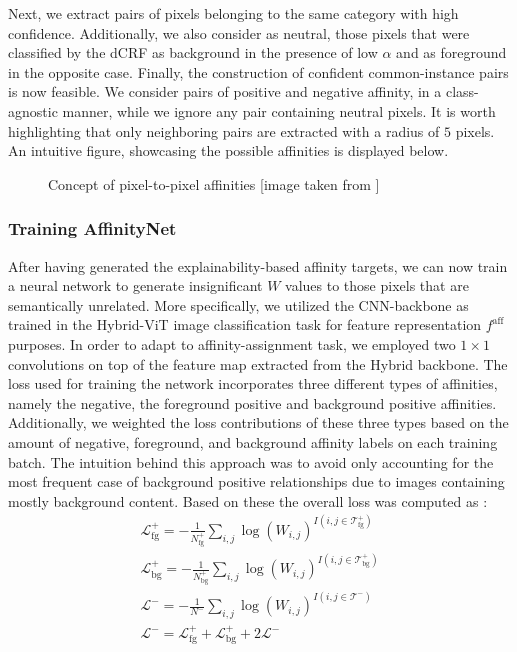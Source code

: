 Next, we extract pairs of pixels belonging to the same category with high confidence. Additionally, we also consider as neutral, those pixels that were classified by the dCRF as background in the presence of low $\alpha$ and as foreground in the opposite case. Finally, the construction of confident common-instance pairs is now feasible. We consider pairs of positive and negative affinity, in a class-agnostic manner, while we ignore any pair containing neutral pixels. It is worth highlighting that only neighboring pairs are extracted with a radius of $5$ pixels. An intuitive figure, showcasing the possible affinities is displayed below.

\begin{figure}[!h]   %
    \centering
    \caption{Concept of pixel-to-pixel affinities [image taken from \cite{ahn2018learning}]}
\end{figure}

\subsubsection{Training AffinityNet}
After having generated the explainability-based affinity targets, we can now train a neural network to generate insignificant $W$ values to those pixels that are semantically unrelated. More specifically, we utilized the CNN-backbone as trained in the Hybrid-ViT image classification task for feature representation $f^\text{aff}$ purposes. In order to adapt to affinity-assignment task, we employed two $1\times1$ convolutions on top of the feature map extracted from the Hybrid backbone. The loss used for training the network incorporates three different types of affinities, namely the negative, the foreground positive and background positive affinities. Additionally, we weighted the loss contributions of these three types based on the amount of negative, foreground, and background affinity labels on each training batch. The intuition behind this approach was to avoid only accounting for the most frequent case of background positive relationships due to images containing mostly background content. Based on these the overall loss was computed as :
\begin{align*}
\mathcal{L}_\text{fg}^+ =- \frac{1}{N_\text{fg}^+}\sum_{i,j}\log(W_{i,j})^{I(i,j\in \mathcal{T}_\text{fg}^+)} \\
\mathcal{L}_\text{bg}^+ =- \frac{1}{N_\text{bg}^+}\sum_{i,j}\log(W_{i,j})^{I(i,j\in \mathcal{T}_\text{bg}^+) } \\
\mathcal{L}^- =- \frac{1}{N^-}\sum_{i,j}\log(W_{i,j})^{I(i,j\in \mathcal{T}^-) } \\
\mathcal{L}^- = \mathcal{L}_\text{fg}^+ + \mathcal{L}_\text{bg}^+ + 2\mathcal{L}^-
\end{align*}

